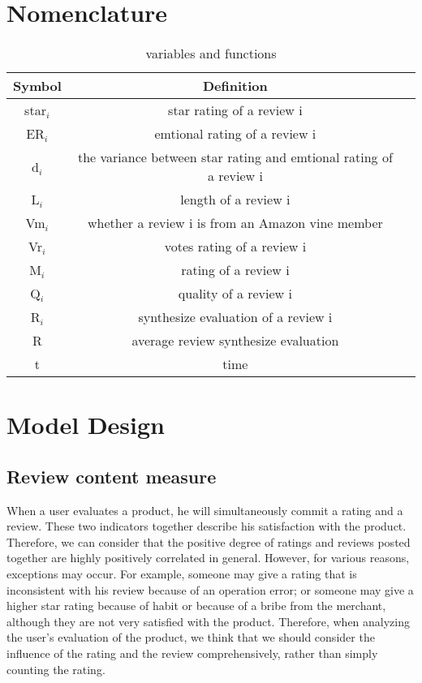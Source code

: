 \documentclass{mcmthesis}
\begin{document}
\section{Nomenclature}
\begin{table}[h]
  \centering
  \begin{tabular}{ccc}
    \hline
    Symbol & Definition\\
    \hline
    star$_{i}$ & star rating of a review i\\
    
    ER$_{i}$ & emtional rating of a review i\\
      
    d$_{i}$ & the variance between star rating and emtional rating of a review i\\

    L$_{i}$ & length of a review i\\

    Vm$_{i}$ & whether a review i is from an Amazon vine member\\
      
    Vr$_{i}$ & votes rating of a review i\\
      
    M$_{i}$ & rating of a review i\\

    Q$_{i}$ & quality of a review i\\
          
    R$_{i}$ & synthesize evaluation of a review i\\
    
    R & average review synthesize evaluation\\
      
    t & time\\
    \hline
  \end{tabular}
  \caption{variables and functions}
\end{table}

\section{ Model Design }
\subsection{ Review content measure }
When a user evaluates a product, he will simultaneously commit a rating and a review. These two indicators together describe his satisfaction with the product. Therefore, we can consider that the positive degree of ratings and reviews posted together are highly positively correlated in general. However, for various reasons, exceptions may occur. For example, someone may give a rating that is inconsistent with his review because of an operation error; or someone may give a higher star rating because of habit or because of a bribe from the merchant, although they are not very satisfied with the product. Therefore, when analyzing the user's evaluation of the product, we think that we should consider the influence of the rating and the review comprehensively, rather than simply counting the rating.
\end{document}

